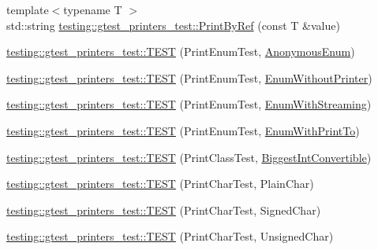 \begin{DoxyCompactItemize}
\item 
{\footnotesize template$<$typename T $>$ }\\std\+::string \mbox{\hyperlink{namespacetesting_1_1gtest__printers__test_a680e1fd7cfbae100466abe89567a0ee9}{testing\+::gtest\+\_\+printers\+\_\+test\+::\+Print\+By\+Ref}} (const T \&value)
\item 
\mbox{\hyperlink{namespacetesting_1_1gtest__printers__test_ac79ac1529e754dddbaff5ba108ba3de3}{testing\+::gtest\+\_\+printers\+\_\+test\+::\+T\+E\+ST}} (Print\+Enum\+Test, \mbox{\hyperlink{googletest-printers-test_8cc_a7a5ee9fe858568a85d80af1312aefb8b}{Anonymous\+Enum}})
\item 
\mbox{\hyperlink{namespacetesting_1_1gtest__printers__test_ae435934e9be88c7813ac6aee2ce0ce53}{testing\+::gtest\+\_\+printers\+\_\+test\+::\+T\+E\+ST}} (Print\+Enum\+Test, \mbox{\hyperlink{googletest-printers-test_8cc_a404f735da62338180a19ae16f80e09c8}{Enum\+Without\+Printer}})
\item 
\mbox{\hyperlink{namespacetesting_1_1gtest__printers__test_a152cda5e11caecc372208103022726d1}{testing\+::gtest\+\_\+printers\+\_\+test\+::\+T\+E\+ST}} (Print\+Enum\+Test, \mbox{\hyperlink{googletest-printers-test_8cc_a52d9f846ca7a081ba3acf88dd6cd46dc}{Enum\+With\+Streaming}})
\item 
\mbox{\hyperlink{namespacetesting_1_1gtest__printers__test_a171e23e5a52e6b7355c00daf8391ec12}{testing\+::gtest\+\_\+printers\+\_\+test\+::\+T\+E\+ST}} (Print\+Enum\+Test, \mbox{\hyperlink{googletest-printers-test_8cc_a904d619d593201ed509be794aed041ec}{Enum\+With\+Print\+To}})
\item 
\mbox{\hyperlink{namespacetesting_1_1gtest__printers__test_a46ee2873cfeb51db5f56be0960ce333b}{testing\+::gtest\+\_\+printers\+\_\+test\+::\+T\+E\+ST}} (Print\+Class\+Test, \mbox{\hyperlink{classBiggestIntConvertible}{Biggest\+Int\+Convertible}})
\item 
\mbox{\hyperlink{namespacetesting_1_1gtest__printers__test_aa0a012b88bd8dee46707bf308aa312d1}{testing\+::gtest\+\_\+printers\+\_\+test\+::\+T\+E\+ST}} (Print\+Char\+Test, Plain\+Char)
\item 
\mbox{\hyperlink{namespacetesting_1_1gtest__printers__test_a08fe11b61c0ff62931f0172dc05c971b}{testing\+::gtest\+\_\+printers\+\_\+test\+::\+T\+E\+ST}} (Print\+Char\+Test, Signed\+Char)
\item 
\mbox{\hyperlink{namespacetesting_1_1gtest__printers__test_a54554ba079349cf09dcb6d522cfb70de}{testing\+::gtest\+\_\+printers\+\_\+test\+::\+T\+E\+ST}} (Print\+Char\+Test, Unsigned\+Char)

\end{DoxyCompactItemize}
